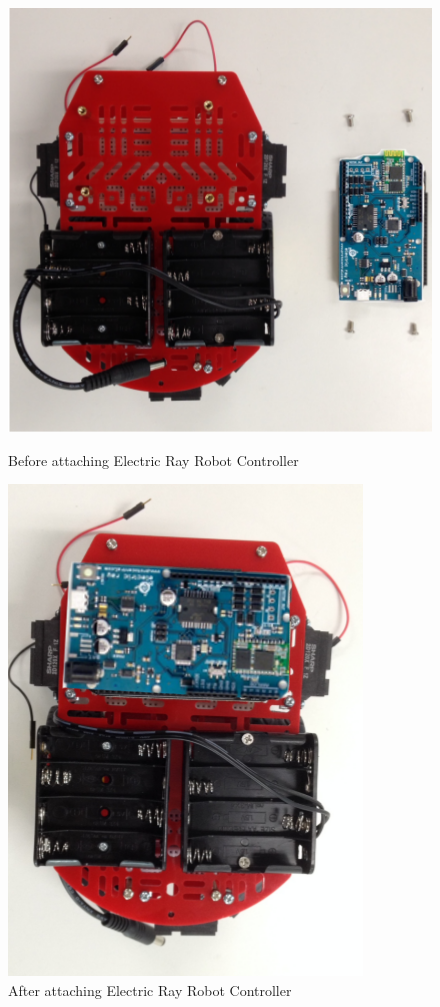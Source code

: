 \begin{figure}[h]
\centering
\includegraphics[width=0.5\columnwidth]{Images/Assembly/9a}
\caption{ Before attaching Electric Ray Robot Controller}
\vspace{2mm}
\includegraphics[width=0.5\columnwidth]{Images/Assembly/9b}
\caption{ After attaching Electric Ray Robot Controller}
\label{fig:controller}
\end{figure}

